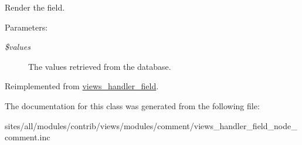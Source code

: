 Render the field.

\begin{Desc}
\item[Parameters:]
\begin{description}
\item[{\em \$values}]The values retrieved from the database. \end{description}
\end{Desc}


Reimplemented from \hyperlink{classviews__handler__field_82ff951c5e9ceb97b2eab86f880cbc1e}{views\_\-handler\_\-field}.

The documentation for this class was generated from the following file:\begin{CompactItemize}
\item 
sites/all/modules/contrib/views/modules/comment/views\_\-handler\_\-field\_\-node\_\-comment.inc\end{CompactItemize}
